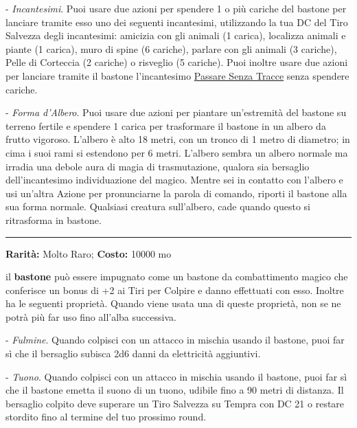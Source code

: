 \begin{multicols}{2}
- \emph{Incantesimi}. Puoi usare due azioni per spendere 1 o più cariche del bastone per lanciare tramite esso uno dei seguenti incantesimi, utilizzando la tua DC del Tiro Salvezza degli incantesimi: amicizia con gli animali (1 carica), localizza animali e piante (1 carica), muro di spine (6 cariche), parlare con gli animali (3 cariche), Pelle di Corteccia (2 cariche) o risveglio (5 cariche). Puoi inoltre usare due azioni per lanciare tramite il bastone l'incantesimo \hyperlink{Passare Senza Tracce}{Passare Senza Tracce} senza spendere cariche.

- \emph{Forma d'Albero}. Puoi usare due azioni per piantare un'estremità del bastone su terreno fertile e spendere 1 carica per trasformare il bastone in un albero da frutto vigoroso. L'albero è alto 18 metri, con un tronco di 1 metro di diametro; in cima i suoi rami si estendono per 6 metri. L'albero sembra un albero normale ma irradia una debole aura di magia di trasmutazione, qualora sia bersaglio dell'incantesimo individuazione del magico. Mentre sei in contatto con l'albero e usi un'altra Azione per pronunciarne la parola di comando, riporti il bastone alla sua forma normale. Qualsiasi creatura sull'albero, cade quando questo si ritrasforma in bastone.

\smallskip\noindent\rule{\linewidth}{2pt}  \hypertarget{BastonedeiTuonieFulmini}{}\smallskip{}\noindent\label{BastonedeiTuonieFulmini}

\textbf{Rarità:} Molto Raro; \textbf{Costo:} 10000 mo

il \textbf{bastone} può essere impugnato come un bastone da combattimento magico che conferisce un bonus di +2 ai Tiri per Colpire e danno effettuati con esso. Inoltre ha le seguenti proprietà. Quando viene usata una di queste proprietà, non se ne potrà più far uso fino all'alba successiva.

- \emph{Fulmine}. Quando colpisci con un attacco in mischia usando il bastone, puoi far sì che il bersaglio subisca 2d6 danni da elettricità aggiuntivi.

- \emph{Tuono}. Quando colpisci con un attacco in mischia usando il bastone, puoi far sì che il bastone emetta il suono di un tuono, udibile fino a 90 metri di distanza. Il bersaglio colpito deve superare un Tiro Salvezza su Tempra con DC 21 o restare stordito fino al termine del tuo prossimo round.


\end{multicols}
